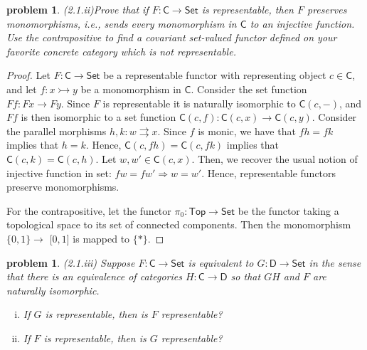 \documentclass[10pt, oneside]{article}   	%
\newcommand{\cat}[1]{\mathsf{#1}}
\newcommand{\cc}{\cat{C}}
\newcommand{\dd}{\cat{D}}
\newcommand{\cset}{\cat{Set}}
\newcommand{\mono}{\rightarrowtail}
\newtheorem{problem}[theorem]{problem}
\begin{document}
\begin{problem}{(2.1.ii)}Prove that if $F : \cc \to \cset$ is representable, then $F$ preserves monomorphisms, i.e., sends every monomorphism in $\cc$ to an injective function. Use the contrapositive to find a covariant set-valued functor defined on your favorite concrete category which is not representable. 
\end{problem}

\begin{proof}
 
 Let $F : \cc \to \cset$ be a representable functor with representing object $c \in \cc$, and let $f : x \mono y$ be a monomorphism in $\cc$. Consider the set function $Ff : Fx \to Fy$. Since $F$ is representable it is naturally isomorphic to $\cc(c, -)$, and $Ff$ is then isomorphic to a set function $\cc(c,f) : \cc(c, x) \to \cc(c, y)$. Consider the parallel morphisms $h, k : w \rightrightarrows x$. Since $f$ is monic, we have that $fh = fk$ implies that $h = k$. Hence, $\cc(c, fh) = \cc(c, fk)$ implies that  $\cc(c, k) = \cc(c, h)$. Let $w, w'\in \cc(c, x)$. Then, we recover the usual notion of injective function in set: $f w = f w' \Rightarrow w = w'$. Hence, representable functors preserve monomorphisms.
 
 For the contrapositive, let the functor $\pi_0 : \cat{Top} \to \cset$ be the functor taking a topological space to its set of connected components. Then the monomorphism $\{0, 1\} \to $ [$0,1$] is mapped to $\{*\}$.
\end{proof}

\begin{problem} (2.1.iii) Suppose $F: \cc \to \cset$ is equivalent to $G: \dd \to \cset$ in the sense that there is an equivalence of categories $H: \cc \to \dd$ so that $GH$ and $F$ are naturally isomorphic. 

\begin{enumerate}[(i)]
	\item If $G$ is representable, then is $F$ representable?
	\item If $F$ is representable, then is $G$ representable?
\end{enumerate}
\end{problem}
\end{document}
